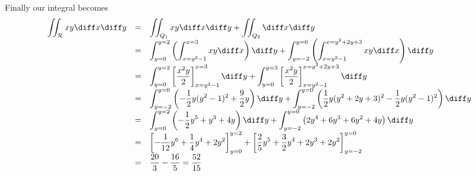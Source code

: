 {Finally our integral becomes 
\[
\begin{array}{rcl}
\displaystyle \iint_{\mathcal R} xy\diff x \diff y&=&\displaystyle \iint_{Q_1}xy \diff x \diff y + \iint_{Q_2}\diff x\diff y \\
&=&\displaystyle \int_{y=0}^{y=2} \left(\int_{x=y^2-1}^{x=3} xy \diff x\right) \diff y+ \int_{y=-2}^{y=0} \left( \int_{x=y^2-1}^{x=y^2+2y+3} xy \diff x \right) \diff y\\
&=&\displaystyle \int_{y=0}^{y=2}\left[ \frac{x^2y}{2}\right]_{x=y^2-1}^{x=3}\diff y+ \int_{y=0}^{y=3}\left[ \frac{x^2y}{2}\right]_{x=y^2-1}^{x=y^2+2y+3}\diff y\\
&=&\displaystyle \int_{y=-2}^{y=0}  \left(-\frac{1}{2} y (y^{2}-1)^{2}+\frac{9}{2} y \right)\diff y  +\int_{y=-2}^{y=0}\left( \frac{1}{2} y (y^{2}+2 y+3)^{2}-\frac{1}{2} y (y^{2}-1)^{2}\right)\diff y\\
&=&\displaystyle\int_{y=0}^{y=2}  \left(-\frac{1}{2} y^{5}+y^{3}+4 y  \right)\diff y  +\int_{y=-2}^{y=0}\left( 2 y^{4}+6 y^{3}+6 y^{2}+4 y\right)\diff y\\
&=&\displaystyle \left[-\frac{1}{12} y^{6}+\frac{1}{4} y^{4}+2 y^{2}\right]_{y=0}^{y=2} +\left[\frac{2}{5} y^{5}+\frac{3}{2} y^{4}+2 y^{3}+2 y^{2} \right]_{y=-2}^{y=0}\\
&=&\displaystyle \frac{20}{3} -\frac{16}{5} =\frac{52}{15}
\end{array}
\]

}

